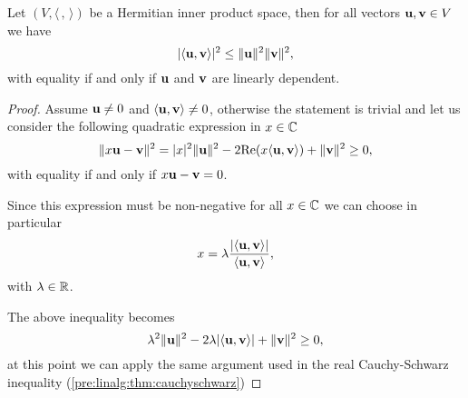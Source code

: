 \documentclass[10pt, a4paper]{article}
\begin{document}
\begin{theorem}
    Let $(V, \langle\,,\,\rangle)$ be a Hermitian inner product space,
    then for all vectors $\mathbf{u}, \mathbf{v} \in V$ we have
    \[
    |\langle\mathbf{u}, \mathbf{v}\rangle| ^ 2 \leq \|\mathbf{u}\| ^ 2\|\mathbf{v}\| ^ 2,
    \]
    with equality if and only if $\mathbf{u}$ and $\mathbf{v}$ are linearly dependent.

    \begin{proof}
        Assume $\mathbf{u} \neq 0$ and $\langle\mathbf{u}, \mathbf{v}\rangle \neq 0$,
        otherwise the statement is trivial and let us consider the following quadratic expression in $x \in \mathbb{C}$
        \[
        \|x\mathbf{u} - \mathbf{v}\| ^ 2 = |x| ^ 2\|\mathbf{u}\| ^ 2 - 2\mathrm{Re}(x\langle\mathbf{u}, \mathbf{v}\rangle) + \|\mathbf{v}\| ^ 2 \geq 0,
        \]
        with equality if and only if $x\mathbf{u} - \mathbf{v} = 0$.

        Since this expression must be non-negative for all $x \in \mathbb{C}$ we can choose in particular
        \[
        x = \lambda\frac{|\langle\mathbf{u}, \mathbf{v}\rangle|}{\langle\mathbf{u}, \mathbf{v}\rangle},
        \]
        with $\lambda \in \mathbb{R}$.

        The above inequality becomes
        \[
        \lambda ^ 2\|\mathbf{u}\| ^ 2 - 2\lambda|\langle\mathbf{u}, \mathbf{v}\rangle| + \|\mathbf{v}\| ^ 2 \geq 0,
        \]
        at this point we can apply the same argument used in the real Cauchy-Schwarz inequality
        (\autoref{pre:linalg:thm:cauchyschwarz})
    \end{proof}
\end{theorem}
\end{document}
